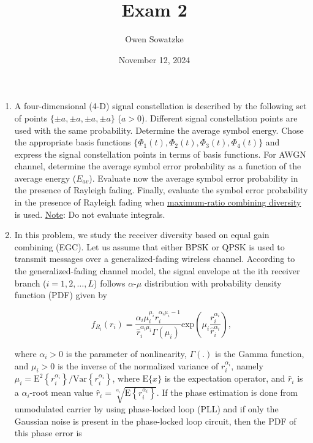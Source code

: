 \documentclass[fleqn]{article}
\title{Exam 2}
\author{Owen Sowatzke}
\date{November 12, 2024}
\makeatletter
\newcommand{\zerodisplayskip}{
	\setlength{\abovedisplayskip}{0pt}%
	\setlength{\belowdisplayskip}{0pt}%
	\setlength{\abovedisplayshortskip}{0pt}%
	\setlength{\belowdisplayshortskip}{0pt}%
	\setlength{\mathindent}{0pt}}
\newenvironment{equationCenter}{\@fleqnfalse\begin{equation*}}{\end{equation*}}
\makeatother
\begin{document}
	\offinterlineskip
	\setlength{\lineskip}{12pt}
	\zerodisplayskip
	\maketitle
	
	\begin{enumerate}
		\item A four-dimensional (4-D) signal constellation is described by the following set of points $\{\pm a, \pm a, \pm a, \pm a\}$ ($a>0$). Different signal constellation points are used with the same probability. Determine the average symbol energy. Chose the appropriate basis functions $\{\Phi_1(t), \Phi_2(t), \Phi_3(t), \Phi_4(t)\}$ and express the signal constellation points in terms of basis functions. For AWGN channel, determine the average symbol error probability as a function of the average energy ($E_{av}$). Evaluate now the average symbol error probability in the presence of Rayleigh fading. Finally, evaluate the symbol error probability in the presence of Rayleigh fading when \underline{maximum-ratio combining diversity} is used. \underline{Note}: Do not evaluate integrals.

		\item In this problem, we study the receiver diversity based on equal gain combining (EGC). Let us assume that either BPSK or QPSK is used to transmit messages over a generalized-fading wireless channel. According to
the generalized-fading channel model, the signal envelope at the ith receiver branch ($i=1,2,\ldots,L$) follows $\alpha$-$\mu$ distribution with probability density function (PDF) given by

		\begin{equationCenter}
			f_{R_i}(r_i) = \frac{\alpha_i\mu_i^{\mu_i}r_i^{\alpha_i\mu_i-1}}{\hat{r}_i^{\alpha_i\mu_i}\Gamma(\mu_i)}\text{exp}\left(\mu_i\frac{r_i^{\alpha_i}}{\hat{r}_i^{\alpha_i}}\right),
		\end{equationCenter}
		
		where $\alpha_i > 0$ is the parameter of nonlinearity, $\Gamma(.)$ is the Gamma function, and $\mu_i > 0$ is the inverse of the normalized variance of $r_i^{\alpha_i}$, namely $\mu_i = \text{E}^2\left\{r_i^{\alpha_i}\right\}/\text{Var}\left\{r_i^{\alpha_i}\right\}$, where $\text{E}\{x\}$ is the expectation operator, and $\hat{r}_i$ is a $\alpha_i$-root mean value $\hat{r}_i=\sqrt[\alpha_i]{\text{E}\left\{r_i^{\alpha_i}\right\}}$. If the phase estimation is done from unmodulated carrier by using phase-locked loop (PLL) and if only the Gaussian noise is present in the phase-locked loop circuit, then the PDF of this phase error is


\end{enumerate}
\end{document}
